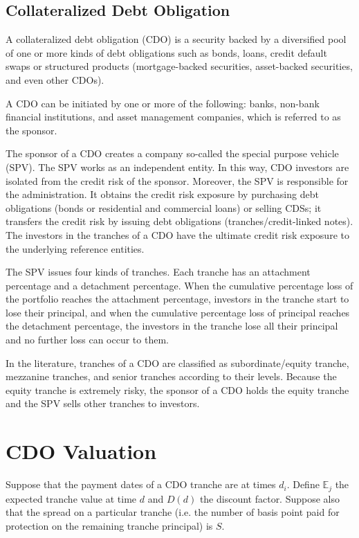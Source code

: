 \subsection{Collateralized Debt Obligation}\label{collateralized-debt-obligation}

A collateralized debt obligation (CDO) is a security backed by a
diversified pool of one or more kinds of debt obligations such as bonds,
loans, credit default swaps or structured products (mortgage-backed
securities, asset-backed securities, and even other CDOs). 

A CDO can be
initiated by one or more of the following: banks, non-bank financial
institutions, and asset management companies, which is referred to as the
sponsor. 

The sponsor of a CDO creates a company so-called the special
purpose vehicle (SPV). The SPV works as an independent entity. In this
way, CDO investors are isolated from the credit risk of the sponsor.
Moreover, the SPV is responsible for the administration. It obtains
the credit risk exposure by purchasing debt obligations (bonds or
residential and commercial loans) or selling CDSs; it transfers the
credit risk by issuing debt obligations (tranches/credit-linked notes).
The investors in the tranches of a CDO have the ultimate credit risk
exposure to the underlying reference entities. 

The SPV issues four kinds
of tranches. Each tranche has an attachment percentage and a detachment
percentage. When the cumulative percentage loss of the portfolio reaches
the attachment percentage, investors in the tranche start to lose their
principal, and when the cumulative percentage loss of principal reaches
the detachment percentage, the investors in the tranche lose all their
principal and no further loss can occur to them.

In the literature, tranches of a CDO are classified as
subordinate/equity tranche, mezzanine tranches, and senior tranches
according to their levels. Because the equity tranche is
extremely risky, the sponsor of a CDO holds the equity tranche and the
SPV sells other tranches to investors.


\section{CDO Valuation}
Suppose that the payment dates of a CDO tranche are at times $d_i$. Define $\mathbb{E}_j$ the expected 
tranche value at time $d$ and $D(d)$ the discount factor. Suppose also that the spread
on a particular tranche (i.e. the number of basis point paid for protection on the remaining tranche principal) is $S$. 

